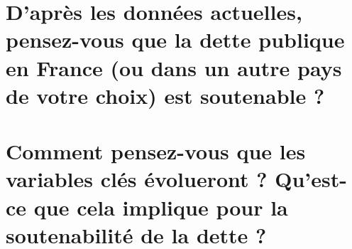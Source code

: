 \documentclass{article}
\begin{document}
\section{D’après les données actuelles, pensez-vous que la dette publique en France (ou dans un autre pays
de votre choix) est soutenable ?
}

\section{Comment pensez-vous que les variables clés évolueront ? Qu’est-ce que cela implique pour la
soutenabilité de la dette ?}
\end{document}
